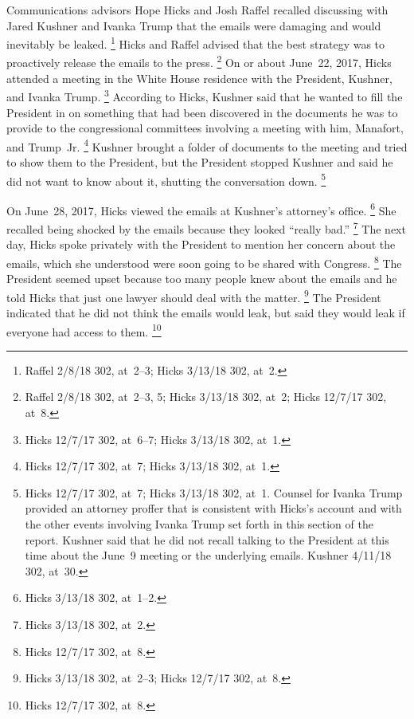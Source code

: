 Communications advisors Hope Hicks and Josh Raffel recalled discussing with Jared Kushner and Ivanka Trump that the emails were damaging and would inevitably be leaked.%
\footnote{Raffel 2/8/18 302, at~2--3;
Hicks 3/13/18 302, at~2.}
Hicks and Raffel advised that the best strategy was to proactively release the emails to the press.%
\footnote{Raffel 2/8/18 302, at~2--3, 5;
Hicks 3/13/18 302, at~2;
Hicks 12/7/17 302, at~8.}
On or about June~22, 2017, Hicks attended a meeting in the White House residence with the President, Kushner, and Ivanka Trump.%
\footnote{Hicks 12/7/17 302, at~6--7;
Hicks 3/13/18 302, at~1.}
According to Hicks, Kushner said that he wanted to fill the President in on something that had been discovered in the documents he was to provide to the congressional committees involving a meeting with him, Manafort, and Trump~Jr.%
\footnote{Hicks 12/7/17 302, at~7;
Hicks 3/13/18 302, at~1.}
Kushner brought a folder of documents to the meeting and tried to show them to the President, but the President stopped Kushner and said he did not want to know about it, shutting the conversation down.%
\footnote{Hicks 12/7/17 302, at~7;
Hicks 3/13/18 302, at~1.
Counsel for Ivanka Trump provided an attorney proffer that is consistent with Hicks's account and with the other events involving Ivanka Trump set forth in this section of the report.
Kushner said that he did not recall talking to the President at this time about the June~9 meeting or the underlying emails.
Kushner 4/11/18 302, at~30.}

On June~28, 2017, Hicks viewed the emails at Kushner's attorney's office.%
\footnote{Hicks 3/13/18 302, at~1--2.}
She recalled being shocked by the emails because they looked ``really bad.''%
\footnote{Hicks 3/13/18 302, at~2.}
The next day, Hicks spoke privately with the President to mention her concern about the emails, which she understood were soon going to be shared with Congress.%
\footnote{Hicks 12/7/17 302, at~8.}
The President seemed upset because too many people knew about the emails and he told Hicks that just one lawyer should deal with the matter.%
\footnote{Hicks 3/13/18 302, at~2--3;
Hicks 12/7/17 302, at~8.}
The President indicated that he did not think the emails would leak, but said they would leak if everyone had access to them.%
\footnote{Hicks 12/7/17 302, at~8.}

